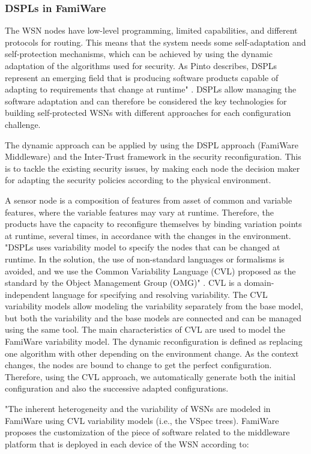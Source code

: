 \documentclass[12pt,a4paper,twoside]{report}
\begin{document}
\subsubsection{DSPLs in FamiWare}
The WSN nodes have low-level programming, limited capabilities, and different protocols for routing. This means that the system needs some self-adaptation and self-protection mechanisms, which can be achieved by using the dynamic adaptation of the algorithms used for security. As Pinto describes, DSPLs represent an emerging field that is producing software products capable of adapting to requirements that change at runtime" \cite{Pinto;etal:2013}. DSPLs allow managing the software adaptation and can therefore be considered the key technologies for building self-protected WSNs with different approaches for each configuration challenge.\par
The dynamic approach can be applied by using the DSPL approach (FamiWare Middleware) and the Inter-Trust framework in the security reconfiguration. This is to tackle the existing security issues, by making each node the decision maker for adapting the security policies according to the physical environment.\par
A sensor node is a composition of features from asset of common and variable features, where the variable features may vary at runtime. Therefore, the products have the capacity to reconfigure themselves by binding variation points at runtime, several times, in accordance with the changes in the environment. "DSPLs uses variability model to specify the nodes that can be changed at runtime. In the solution, the use of non-standard languages or formalisms is avoided, and we use the Common Variability Language (CVL) proposed as the standard by the Object Management Group (OMG)" \cite{Pinto;etal:2013}. CVL is a domain-independent language for specifying and resolving variability. The CVL variability models allow modeling the variability separately from the base model, but both the variability and the base models are connected and can be managed using the same tool. The main characteristics of CVL are used to model the FamiWare variability model. The dynamic reconfiguration is defined as replacing one algorithm with other depending on the environment change. As the context changes, the nodes are bound to change to get the perfect configuration. Therefore, using the CVL approach, we automatically generate both the initial configuration and also the successive adapted configurations. \par
"The inherent heterogeneity and the variability of WSNs are modeled in FamiWare using CVL variability models (i.e., the VSpec trees). FamiWare proposes the customization of the piece of software related to the middleware platform that is deployed in each device of the WSN according to: \par
\end{document}
